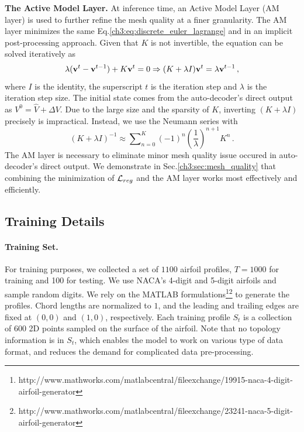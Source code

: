 \noindent \textbf{The Active Model Layer.}
At inference time, an Active Model Layer (AM layer) is used to further refine the mesh quality at a finer granularity.
The AM layer minimizes the same Eq.\ref{ch3:eq:discrete_euler_lagrange} and in an implicit post-processing approach.
Given that $K$ is not invertible, the equation can be solved iteratively as
\begin{equation}
    \lambda ({\mathbf{v}^t} - {\mathbf{v}^{t - 1}}) + K{\mathbf{v}^t} = 0 \Rightarrow (K + \lambda I){\mathbf{v}^t} = \lambda {\mathbf{v}^{t - 1}}\,,
\end{equation}
where $I$ is the identity, the superscript $t$ is the iteration step and $\lambda$ is the iteration step size.
The initial state comes from the auto-decoder's direct output as $V^0=\hat{V}+\Delta V$.
Due to the large size and the sparsity of $K$, inverting $(K + \lambda I)$ precisely is impractical.
Instead, we use the Neumann series with
\begin{equation}
    {(K + \lambda I)^{ - 1}} \approx \sum\nolimits_{n = 0}^K {{{( - 1)}^n}} {\left(\frac{1}{\lambda }\right)^{n + 1}}{K^n}\,.
    \label{ch3:eq:active_model_iteration}
\end{equation}
The AM layer is necessary to eliminate minor mesh quality issue occured in auto-decoder's direct output.
We demonstrate in Sec.\ref{ch3:sec:mesh_quality} that combining the minimization of $\mathcal{L}_{reg}$ and the AM layer works most effectively and efficiently.

\subsection{Training Details}

\paragraph{Training Set.}
For training purposes, we collected a set of $1100$ airfoil profiles, $T=1000$ for training and 100 for testing. We use NACA's 4-digit and 5-digit airfoils and sample random digits.  We rely on the MATLAB formulations\footnote{http://www.mathworks.com/matlabcentral/fileexchange/19915-naca-4-digit-airfoil-generator}\footnote{http://www.mathworks.com/matlabcentral/fileexchange/23241-naca-5-digit-airfoil-generator} to generate the profiles. Chord lengths are normalized to $1$, and the leading and trailing edges are fixed at $(0,0)$ and $(1,0)$, respectively. Each training profile $S_t$ is a collection of $600$ 2D points sampled on the surface of the airfoil.
Note that no topology information is in $S_t$, which enables the model to work on various type of data format, and reduces the demand for complicated data pre-processing. 

